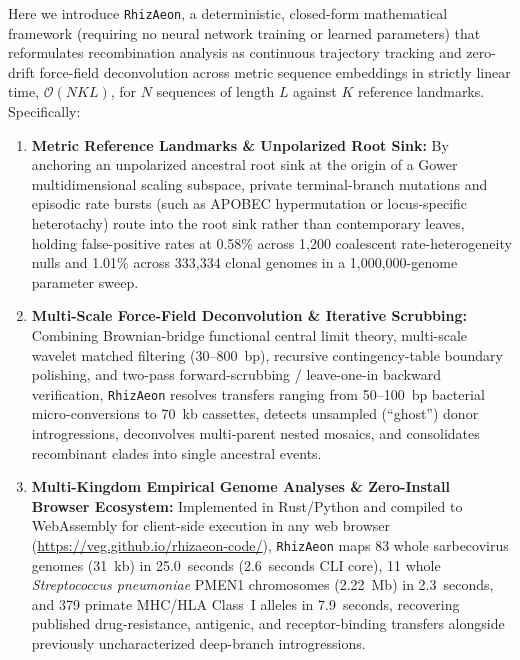 \documentclass[11pt,letterpaper]{article}
\begin{document}
Here we introduce \texttt{RhizAeon}, a deterministic, closed-form mathematical framework (requiring no neural network training or learned parameters) that reformulates recombination analysis as continuous trajectory tracking and zero-drift force-field deconvolution across metric sequence embeddings in strictly linear time, $\mathcal{O}(NKL)$, for $N$ sequences of length $L$ against $K$ reference landmarks. Specifically:
\begin{enumerate}
\item \textbf{Metric Reference Landmarks \& Unpolarized Root Sink:} By anchoring an unpolarized ancestral root sink at the origin of a Gower multidimensional scaling subspace, private terminal-branch mutations and episodic rate bursts (such as APOBEC hypermutation or locus-specific heterotachy) route into the root sink rather than contemporary leaves, holding false-positive rates at 0.58\% across 1,200 coalescent rate-heterogeneity nulls and 1.01\% across 333,334 clonal genomes in a 1,000,000-genome parameter sweep.
\item \textbf{Multi-Scale Force-Field Deconvolution \& Iterative Scrubbing:} Combining Brownian-bridge functional central limit theory, multi-scale wavelet matched filtering (30--800~bp), recursive contingency-table boundary polishing, and two-pass forward-scrubbing / leave-one-in backward verification, \texttt{RhizAeon} resolves transfers ranging from 50--100~bp bacterial micro-conversions to 70~kb cassettes, detects unsampled (``ghost'') donor introgressions, deconvolves multi-parent nested mosaics, and consolidates recombinant clades into single ancestral events.
\item \textbf{Multi-Kingdom Empirical Genome Analyses \& Zero-Install Browser Ecosystem:} Implemented in Rust/Python and compiled to WebAssembly for client-side execution in any web browser (\url{https://veg.github.io/rhizaeon-code/}), \texttt{RhizAeon} maps 83 whole sarbecovirus genomes (31~kb) in 25.0~seconds (2.6~seconds CLI core), 11 whole \textit{Streptococcus pneumoniae} PMEN1 chromosomes (2.22~Mb) in 2.3~seconds, and 379 primate MHC/HLA Class~I alleles in 7.9~seconds, recovering published drug-resistance, antigenic, and receptor-binding transfers alongside previously uncharacterized deep-branch introgressions.
\end{enumerate}
\end{document}
